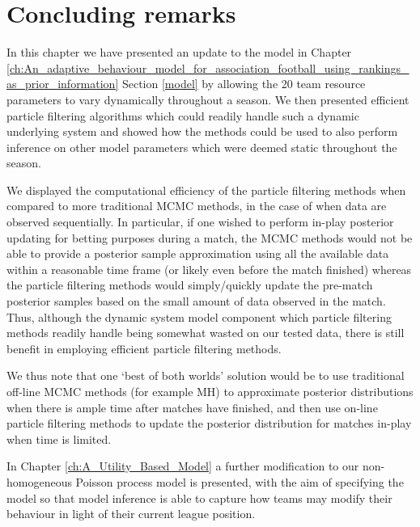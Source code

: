 \section{Concluding remarks}
\label{sec:Concluding_remarks_particle}

In this chapter we have presented an update to the model in Chapter
\ref{ch:An_adaptive_behaviour_model_for_association_football_using_rankings_as_prior_information} Section \ref{model} by
allowing the 20 team resource parameters to vary dynamically throughout a season. We then presented efficient particle
filtering algorithms which could readily handle such a dynamic underlying system and showed how the methods could be
used to also perform inference on other model parameters which were deemed static throughout the season.

We displayed the computational efficiency of the particle filtering methods when compared to more traditional \gls{MCMC}
methods, in the case of when data are observed sequentially. In particular, if one wished to perform in-play posterior
updating for betting purposes during a match, the \gls{MCMC} methods would not be able to provide a posterior sample
approximation using all the available data within a reasonable time frame (or likely even before the match finished)
whereas the particle filtering methods would simply/quickly update the pre-match posterior samples based on the small
amount of data observed in the match. Thus, although the dynamic system model component which particle filtering methods
readily handle being somewhat wasted on our tested data, there is still benefit in employing efficient particle
filtering methods.

We thus note that one `best of both worlds' solution would be to use traditional off-line \gls{MCMC} methods (for
example \gls{MH}) to approximate posterior distributions when there is ample time after matches have finished, and then
use on-line particle filtering methods to update the posterior distribution for matches in-play when time is limited.

In Chapter \ref{ch:A_Utility_Based_Model} a further modification to our non-homogeneous Poisson process model is
presented, with the aim of specifying the model so that model inference is able to capture how teams may modify their
behaviour in light of their current league position.

